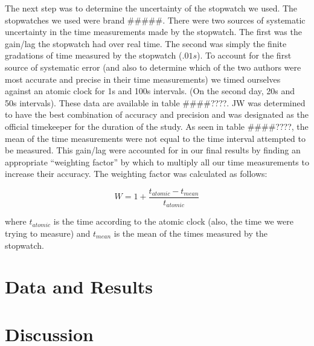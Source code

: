 \documentclass[iop]{emulateapj}
\def\fillin{\#\#\#\#????}
\begin{document}
The next step was to determine the uncertainty of the stopwatch we used.  The
stopwatches we used were brand \#\#\#\#\#.  There were two sources of systematic 
uncertainty in the time measurements made by the stopwatch.  The first was the 
gain/lag the stopwatch had over real time.  The second was simply the finite 
gradations of time measured by the stopwatch ($.01 s$).  To account for the 
first source of systematic error (and also to determine which of the two 
authors were most accurate and precise in their time measurements) we timed 
ourselves against an atomic clock for 1s and 100s intervals.  (On the second
day, 20s and 50s intervals).  These data are available in table \fillin.  JW 
was determined to have the best combination of accuracy and precision and was 
designated as the official timekeeper for the duration of the study.  As seen 
in table \fillin, the mean of the time measurements were not equal to the time 
interval attempted to be measured.  This gain/lag were accounted for in our 
final results by finding an appropriate ``weighting factor'' by which to 
multiply all our time measurements to increase their accuracy.  The weighting 
factor was calculated as follows:

\begin{equation}
\label{eq:timeweight}
W = 1 + \frac{t_{atomic}-t_{mean}}{t_{atomic}} 
\end{equation}

where $t_{atomic}$ is the time according to the atomic clock (also, the time we 
were trying to measure) and $t_{mean}$ is the mean of the times measured by the 
stopwatch.







\section{Data and Results}
\label{sec:data}













\section{Discussion}
\label{sec:discuss}
\end{document}
